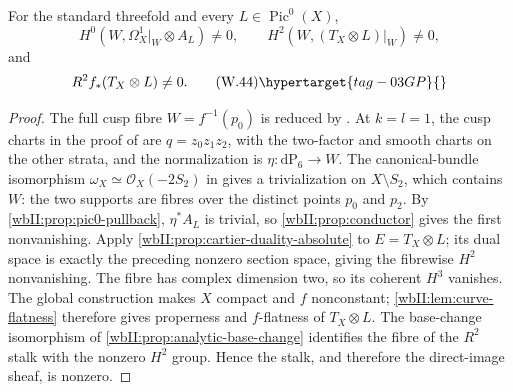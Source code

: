 \begin{corollary}
\hypertarget{tag-03DS}{}\label{wbII:cor:candidate-pic0-route}

For the standard threefold and every
$L\in\operatorname{Pic}^0(X)$,
\[
 H^0(W,\Omega_X^1|_W\otimes A_L)\ne0,
 \qquad
 H^2(W,(T_X\otimes L)|_W)\ne0,
\]
and
\[
 R^2f_*(T_X\otimes L)\ne0.
\tag{W.44}\hypertarget{tag-03GP}{}\label{wbII:eq:W:5.17f}
\]
\end{corollary}



\begin{proof}
The full cusp fibre $W=f^{-1}(p_0)$ is reduced by
.
At $k=l=1$, the cusp charts in the proof of
 are $q=z_0z_1z_2$,
with the two-factor and smooth charts on the other strata,
and the normalization is $\eta:\mathrm{dP}_6\to W$.
The canonical-bundle isomorphism
$\omega_X\simeq\mathcal O_X(-2S_2)$ in
 gives a trivialization on
$X\setminus S_2$, which contains $W$: the two supports
are fibres over the distinct points $p_0$ and $p_2$. By
\cref{wbII:prop:pic0-pullback}, $\eta^*A_L$ is trivial, so
\cref{wbII:prop:conductor} gives the first nonvanishing.  Apply
\cref{wbII:prop:cartier-duality-absolute} to $E=T_X\otimes L$; its dual space is
exactly the preceding nonzero section space, giving the fibrewise $H^2$
nonvanishing.  The fibre has complex dimension two, so its coherent
$H^3$ vanishes.  The global construction makes $X$ compact and $f$
nonconstant; \cref{wbII:lem:curve-flatness} therefore gives properness and
$f$-flatness of $T_X\otimes L$.  The base-change isomorphism of
\cref{wbII:prop:analytic-base-change} identifies the fibre of the $R^2$
stalk with the nonzero $H^2$ group.  Hence the stalk, and therefore the
direct-image sheaf, is nonzero.

\end{proof}